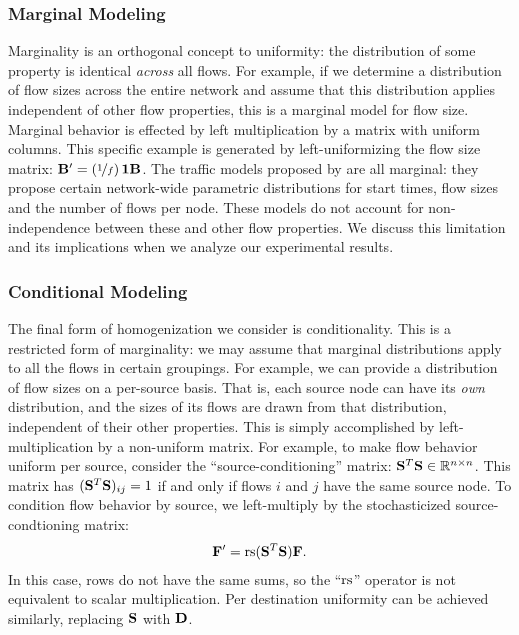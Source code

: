 \documentclass[twocolumn,final]{svjour3}
\begin{document}
\subsubsection{Marginal Modeling}

Marginality is an orthogonal concept to uniformity:
the distribution of some property is identical \textit{across} all flows.
For example, if we determine a distribution of flow sizes across the entire network and assume that this distribution applies independent of other flow properties, this is a marginal model for flow size.
Marginal behavior is effected by left multiplication by a matrix with uniform columns.
This specific example is generated by left-uniformizing the flow size matrix:
$\mathbf{B}' = (\nicefrac{1}{f})\,\mathbf{1}\mathbf{B}$.
The traffic models proposed by {\FHC} are all marginal:
they propose certain network-wide parametric distributions for start times, flow sizes and the number of flows per node.
These models do not account for non-independence between these and other flow properties.
We discuss this limitation and its implications when we analyze our experimental results.

\subsubsection{Conditional Modeling}

The final form of homogenization we consider is conditionality.
This is a restricted form of marginality:
we may assume that marginal distributions apply to all the flows in certain groupings.
For example, we can provide a distribution of flow sizes on a per-source basis.
That is, each source node can have its \textit{own} distribution, and the sizes of its flows are drawn from that distribution, independent of their other properties.
This is simply accomplished by left-multiplication by a non-uniform matrix.
For example, to make flow behavior uniform per source, consider the ``source-conditioning'' matrix:
${\mathbf{S}}^T\mathbf{S} \in \mathbb{R}^{n \times n}$.
This matrix has $({\mathbf{S}}^T\mathbf{S})_{ij} = 1$ if and only if flows $i$ and $j$ have the same source node.
To condition flow behavior by source, we left-multiply by the stochasticized source-condtioning matrix:
\begin{align}
  \mathbf{F}'= \text{rs}({\mathbf{S}}^T\mathbf{S})\mathbf{F}.
\end{align}
In this case, rows do not have the same sums, so the ``$\text{rs}$'' operator is not equivalent to scalar multiplication.
Per destination uniformity can be achieved similarly, replacing $\mathbf{S}$ with $\mathbf{D}$.
\end{document}
